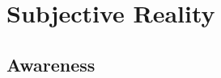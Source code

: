 \documentclass[
11pt,
titlepage,
reqno,
]{article}%
\theoremstyle{definition}
\begin{document}


%	
%
%	
	

\section{Subjective Reality}

\subsection{Awareness}
\end{document}
